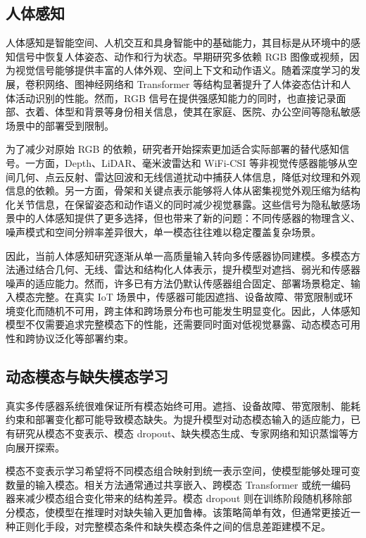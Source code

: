 \documentclass[journal]{IEEEtran}
\begin{document}
\subsection{人体感知}

人体感知是智能空间、人机交互和具身智能中的基础能力，其目标是从环境中的感知信号中恢复人体姿态、动作和行为状态。早期研究多依赖 RGB 图像或视频，因为视觉信号能够提供丰富的人体外观、空间上下文和动作语义。随着深度学习的发展，卷积网络、图神经网络和 Transformer 等结构显著提升了人体姿态估计和人体活动识别的性能。然而，RGB 信号在提供强感知能力的同时，也直接记录面部、衣着、体型和背景等身份相关信息，使其在家庭、医院、办公空间等隐私敏感场景中的部署受到限制。

为了减少对原始 RGB 的依赖，研究者开始探索更加适合实际部署的替代感知信号。一方面，Depth、LiDAR、毫米波雷达和 WiFi-CSI 等非视觉传感器能够从空间几何、点云反射、雷达回波和无线信道扰动中捕获人体信息，降低对纹理和外观信息的依赖。另一方面，骨架和关键点表示能够将人体从密集视觉外观压缩为结构化关节信息，在保留姿态和动作语义的同时减少视觉暴露。这些信号为隐私敏感场景中的人体感知提供了更多选择，但也带来了新的问题：不同传感器的物理含义、噪声模式和空间分辨率差异很大，单一模态往往难以稳定覆盖复杂场景。

因此，当前人体感知研究逐渐从单一高质量输入转向多传感器协同建模。多模态方法通过结合几何、无线、雷达和结构化人体表示，提升模型对遮挡、弱光和传感器噪声的适应能力。然而，许多已有方法仍默认传感器组合固定、部署场景稳定、输入模态完整。在真实 IoT 场景中，传感器可能因遮挡、设备故障、带宽限制或环境变化而随机不可用，跨主体和跨场景分布也可能发生明显变化。因此，人体感知模型不仅需要追求完整模态下的性能，还需要同时面对低视觉暴露、动态模态可用性和跨协议泛化等部署约束。

\subsection{动态模态与缺失模态学习}

真实多传感器系统很难保证所有模态始终可用。遮挡、设备故障、带宽限制、能耗约束和部署变化都可能导致模态缺失。为提升模型对动态模态输入的适应能力，已有研究从模态不变表示、模态 dropout、缺失模态生成、专家网络和知识蒸馏等方向展开探索。

模态不变表示学习希望将不同模态组合映射到统一表示空间，使模型能够处理可变数量的输入模态。相关方法通常通过共享嵌入、跨模态 Transformer 或统一编码器来减少模态组合变化带来的结构差异。模态 dropout 则在训练阶段随机移除部分模态，使模型在推理时对缺失输入更加鲁棒。该策略简单有效，但通常更接近一种正则化手段，对完整模态条件和缺失模态条件之间的信息差距建模不足。
\end{document}
